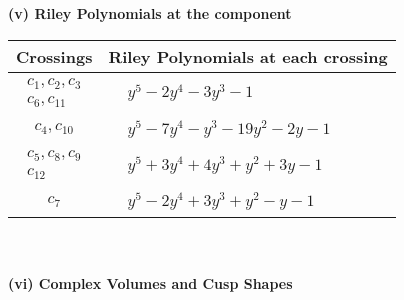 \documentclass[1p]{elsarticle_modified}
\theoremstyle{definition}
\begin{document}
\newpage\renewcommand{\arraystretch}{1}
\flushleft \textbf{(v) Riley Polynomials at the component}\newline \\
\begin{tabular}{m{50pt}|m{274pt}}
Crossings & \hspace{64pt}Riley Polynomials at each crossing \\
\hline $$\begin{aligned}c_{1},c_{2},c_{3}\\c_{6},c_{11}\end{aligned}$$&$\begin{aligned}
&y^5-2 y^4-3 y^3-1
\end{aligned}$\\
\hline $$\begin{aligned}c_{4},c_{10}\end{aligned}$$&$\begin{aligned}
&y^5-7 y^4- y^3-19 y^2-2 y-1
\end{aligned}$\\
\hline $$\begin{aligned}c_{5},c_{8},c_{9}\\c_{12}\end{aligned}$$&$\begin{aligned}
&y^5+3 y^4+4 y^3+y^2+3 y-1
\end{aligned}$\\
\hline $$\begin{aligned}c_{7}\end{aligned}$$&$\begin{aligned}
&y^5-2 y^4+3 y^3+y^2- y-1
\end{aligned}$\\
\hline
\end{tabular}\\~\\
\newpage\flushleft \textbf{(vi) Complex Volumes and Cusp Shapes}
\end{document}
